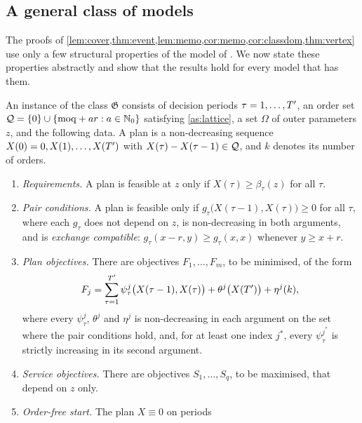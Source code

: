 \subsection{A general class of models}\label{app:general}

The proofs of \cref{lem:cover,thm:event,lem:memo,cor:memo,cor:classdom,thm:vertex} use only a
few structural properties of the model of \citet{Kania2022CIE}. We now state these
properties abstractly and show that the results hold for every model that has them.

\begin{definition}\label{def:class}
  An instance of the class $\mathfrak{G}$ consists of decision periods $\tau=1,\dots,T'$, an
  order set $\mathcal{Q}=\{0\}\cup\{\mathrm{moq}+ar:a\in\mathbb{N}_0\}$ satisfying \cref{as:lattice}, a set
  $\Omega$ of outer parameters $z$, and the following data. A plan is a non-decreasing
  sequence $X(0)=0,X(1),\dots,X(T')$ with $X(\tau)-X(\tau-1)\in\mathcal{Q}$, and $k$ denotes its
  number of orders.
  \begin{enumerate}[label=(G\arabic*),leftmargin=*,nosep]
    \item\label{G:req} \emph{Requirements.} A plan is feasible at $z$ only if
      $X(\tau)\ge\beta_\tau(z)$ for all $\tau$.
    \item\label{G:pair} \emph{Pair conditions.} A plan is feasible only if
      $g_\tau\bigl(X(\tau-1),X(\tau)\bigr)\ge0$ for all $\tau$, where each $g_\tau$ does not
      depend on $z$, is non-decreasing in both arguments, and is \emph{exchange compatible}:
      $g_\tau(x-r,y)\ge g_\tau(x,x)$ whenever $y\ge x+r$.
    \item\label{G:obj} \emph{Plan objectives.} There are objectives $F_1,\dots,F_m$, to be
      minimised, of the form
      \[
        F_j=\sum_{\tau=1}^{T'}\psi^j_\tau\bigl(X(\tau-1),X(\tau)\bigr)
           +\theta^j\bigl(X(T')\bigr)+\eta^j(k),
      \]
      where every $\psi^j_\tau$, $\theta^j$ and $\eta^j$ is non-decreasing in each argument
      on the set where the pair conditions hold, and, for at least one index $j^\ast$, every
      $\psi^{j^\ast}_\tau$ is strictly increasing in its second argument.
    \item\label{G:serv} \emph{Service objectives.} There are objectives $S_1,\dots,S_q$, to be
      maximised, that depend on $z$ only.
    \item\label{G:init} \emph{Order-free start.} The plan $X\equiv0$ on periods

\end{enumerate}
\end{definition}
